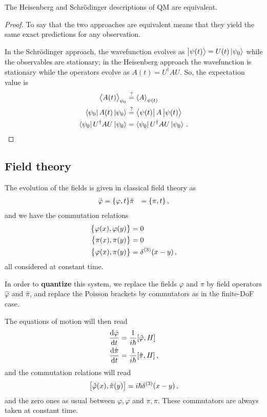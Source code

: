 \documentclass[main.tex]{subfiles}
\begin{document}
\begin{claim}
The Heisenberg and Schrödinger descriptions of QM are equivalent.
\end{claim}

\begin{proof}
To say that the two approaches are equivalent means that they yield the same exact predictions for any observation.

In the Schrödinger approach, the wavefunction evolves as \(\ket{\psi (t)} = U(t) \ket{\psi_0 }\) while the observables are stationary; in the Heisenberg approach the wavefunction is stationary while the operators evolve as \(A(t) = U ^\dag A U\). So, the expectation value is 
%
\begin{align}
\expval{A(t)}_{\psi_0 } &\overset{?}{=} \expval{A}_{\psi (t)}  \\
\bra{\psi_0 } A(t) \ket{\psi_0 } &\overset{?}{=} \bra{\psi (t)} A \ket{\psi (t)} \\
\bra{\psi_0 } U ^\dag A U\ket{\psi_0 } &= \bra{\psi_0 } U ^\dag A U \ket{\psi_0 } 
\,.
\end{align}
\end{proof}

\subsection{Field theory}

The evolution of the fields is given in classical field theory as 
%
\begin{align}
\dot{\varphi} &= \qty{\varphi , t}
\dot{\pi} &= \qty{\pi , t}
\,,
\end{align}
%
and we have the commutation relations 
%
\begin{align}
\qty{\varphi (x), \varphi (y)} &=0  \\
\qty{ \pi (x), \pi (y)} &= 0  \\
\qty{\varphi (x), \pi (y)} &= \delta^{(3)}(x-y)
\,,
\end{align}
%
all considered at constant time. 

In order to \textbf{quantize} this system, we replace the fields \(\varphi \) and \(\pi \) by field operators \(\hat{\varphi}\) and \(\hat{\pi}\), and replace the Poisson brackets by commutators as in the finite-DoF case.

The equations of motion will then read 
%
\begin{align}
\dv{\hat{\varphi}}{t} &= \frac{1}{i \hbar} \qty[\hat{\varphi}, H] \\
\dv{\hat{\pi}}{t} &= \frac{1}{i \hbar} \qty[\hat{\pi}, H] 
\,,
\end{align}
%
and the commutation relations will read 
%
\begin{align}
\qty[\hat{\varphi}(x), \hat{\pi }(y)] = i \hbar \delta^{(3)}(x-y)
\,,
\end{align}
%
and the zero ones as usual between \(\varphi, \varphi \) and \(\pi , \pi \).
These commutators are always taken at constant time. 
\end{document}
